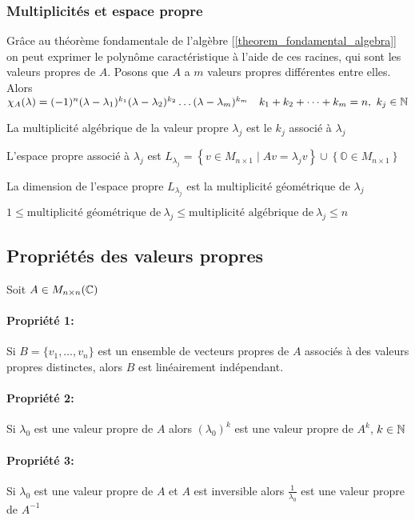 \subsubsection{Multiplicités et espace propre}
Grâce au théorème fondamentale de l'algèbre [\ref{theorem_fondamental_algebra}] on peut
exprimer le polynôme caractéristique à l'aide de ces racines, qui sont les valeurs propres
de $A$. Posons que $A$ a $m$  valeurs propres différentes entre elles. Alors
$\chi_A(\lambda) = (-1)^n(\lambda - \lambda_1)^{k_1}(\lambda - \lambda_2)^{k_2} \dots (\lambda - \lambda_m)^{k_m}
    \quad k_1 + k_2 + \dots + k_m = n, \ k_j \in \mathbb{N}$
\begin{definition}
    La multiplicité algébrique de la valeur propre $\lambda_j$ est le $k_j$ associé à $\lambda_j$
\end{definition}
\begin{definition}
    L'espace propre associé à $\lambda_j$ est
    $L_{\lambda_j} = \left\{ v \in M_{n \times 1} \mid Av = \lambda_j v \right\} \cup \left\{\mathbb{O} \in M_{n \times 1}\right\}$
\end{definition}
\begin{definition}
    La dimension de l'espace propre $L_{\lambda_j}$ est la multiplicité géométrique de $\lambda_j$
\end{definition}
\begin{lemma}
    $1 \leq \text{multiplicité géométrique de} \ \lambda_j \leq \text{multiplicité algébrique de} \ \lambda_j \leq n$
\end{lemma}

\subsection{Propriétés des valeurs propres} %
Soit $A \in M_{n \times n}(\mathbb{C})$
\paragraph{Propriété 1:} Si $B = \{v_1, \dots, v_n\}$ est un ensemble de vecteurs propres de $A$
associés à des valeurs propres distinctes, alors $B$ est linéairement indépendant.
\paragraph{Propriété 2:} Si $\lambda_0$ est une valeur propre de $A$ alors $(\lambda_0)^k$ est une
valeur propre de $A^k$, $k \in \mathbb{N}$
\paragraph{Propriété 3:} Si $\lambda_0$ est une valeur propre de $A$ et $A$ est inversible alors
$\frac{1}{\lambda_0}$ est une valeur propre de $A^{-1}$
